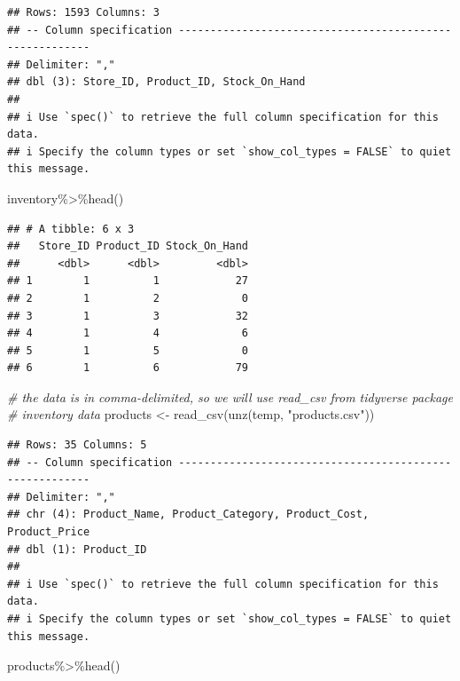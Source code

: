 \documentclass[
]{book}
\newenvironment{Shaded}{\begin{snugshade}}{\end{snugshade}}
\newcommand{\CommentTok}[1]{\textcolor[rgb]{0.56,0.35,0.01}{\textit{#1}}}
\newcommand{\FunctionTok}[1]{\textcolor[rgb]{0.00,0.00,0.00}{#1}}
\newcommand{\NormalTok}[1]{#1}
\newcommand{\OtherTok}[1]{\textcolor[rgb]{0.56,0.35,0.01}{#1}}
\newcommand{\SpecialCharTok}[1]{\textcolor[rgb]{0.00,0.00,0.00}{#1}}
\newcommand{\StringTok}[1]{\textcolor[rgb]{0.31,0.60,0.02}{#1}}
\begin{document}
\begin{verbatim}
## Rows: 1593 Columns: 3
## -- Column specification --------------------------------------------------------
## Delimiter: ","
## dbl (3): Store_ID, Product_ID, Stock_On_Hand
## 
## i Use `spec()` to retrieve the full column specification for this data.
## i Specify the column types or set `show_col_types = FALSE` to quiet this message.
\end{verbatim}

\begin{Shaded}
\begin{Highlighting}[]
\NormalTok{inventory}\SpecialCharTok{\%\textgreater{}\%}\FunctionTok{head}\NormalTok{()}
\end{Highlighting}
\end{Shaded}

\begin{verbatim}
## # A tibble: 6 x 3
##   Store_ID Product_ID Stock_On_Hand
##      <dbl>      <dbl>         <dbl>
## 1        1          1            27
## 2        1          2             0
## 3        1          3            32
## 4        1          4             6
## 5        1          5             0
## 6        1          6            79
\end{verbatim}

\begin{Shaded}
\begin{Highlighting}[]
\CommentTok{\# the data is in comma{-}delimited, so we will use \textasciigrave{}read\_csv\textasciigrave{} from \textasciigrave{}tidyverse\textasciigrave{} package}
\CommentTok{\# inventory data}
\NormalTok{products }\OtherTok{\textless{}{-}} \FunctionTok{read\_csv}\NormalTok{(}\FunctionTok{unz}\NormalTok{(temp, }\StringTok{"products.csv"}\NormalTok{))}
\end{Highlighting}
\end{Shaded}

\begin{verbatim}
## Rows: 35 Columns: 5
## -- Column specification --------------------------------------------------------
## Delimiter: ","
## chr (4): Product_Name, Product_Category, Product_Cost, Product_Price
## dbl (1): Product_ID
## 
## i Use `spec()` to retrieve the full column specification for this data.
## i Specify the column types or set `show_col_types = FALSE` to quiet this message.
\end{verbatim}

\begin{Shaded}
\begin{Highlighting}[]
\NormalTok{products}\SpecialCharTok{\%\textgreater{}\%}\FunctionTok{head}\NormalTok{()}
\end{Highlighting}
\end{Shaded}
\end{document}
